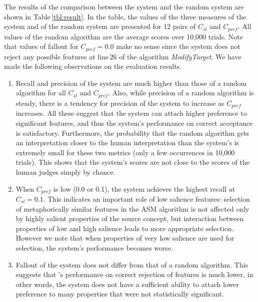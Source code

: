 The results of the comparison between the \SNAME\/ system and the random system 
are shown in Table\,\ref{tbl:result}.
In the table, the values of the three measures of the \SNAME\/ system and of
the random system are presented for 12 pairs of $C_{sl}$ and $C_{pref}$. 
All values of the random algorithm are the average scores over 10,000 trials.
Note that values of fallout for $C_{pref}=0.0$ make no sense since
the system does not reject any possible features at line\,26 of the algorithm {\it ModifyTarget}.
We have made the following observations on the evaluation results.
\begin{enumerate}
  \renewcommand{\theenumi}{}
  \renewcommand{\labelenumi}{}
  \addtolength{\itemsep}{-\parsep}
\item Recall and precision of the \SNAME\/ system are much higher 
  than those of a random algorithm for all $C_{sl}$ and $C_{pref}$.
  Also, while precision of a random algorithm is steady, 
  there is a tendency for precision of the system to increase as $C_{pref}$ increases.
  All these suggest that the \SNAME\/ system can attach higher 
  preference to significant features,
  and thus the system's performance on correct acceptance is satisfactory.
  Furthermore, the probability that the random algorithm gets an interpretation 
  closer to the human interpretation than the system's 
  is extremely small for these two metrics (only a few occurrences in 10,000 trials). 
  This shows that the system's scores are not close to the scores of the human judges 
  simply by chance.

\item When $C_{pref}$ is low (0.0 or 0.1), 
  the system achieves the highest recall at $C_{sl}=0.1$.
  This indicates an important role of low salience features:
  selection of metaphorically similar features in the ASM algorithm is not
  affected only by highly salient properties of the source concept, but
  interaction between properties of low and high salience leads to 
  more appropriate selection.
  However we note that when properties of very low salience are used for selection, 
  the system's performance becomes worse.

\item Fallout of the system does not differ from that of a random algorithm.
  This suggests that \SNAME\/'s performance on correct rejection of features 
  is much lower, in other words, the system does not have a sufficient ability to 
  attach lower preference to many properties that were not statistically significant.
\end{enumerate}

